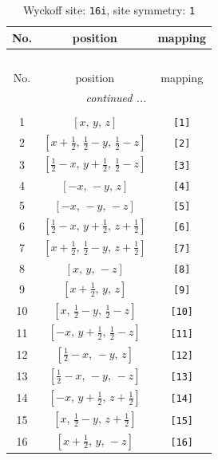 \documentclass[fleqn,8pt]{jsarticle}
\begin{document}
\begin{longtable}{ccc}
\caption{Wyckoff site: {\tt 16i}, site symmetry: {\tt 1}}
 \\
 \hline \hline
No. & position & mapping \\ \hline \endfirsthead

\multicolumn{2}{l}{\tablename\ \thetable{}} \\
 \hline \hline
No. & position & mapping \\ \hline \endhead

 \hline \hline
\multicolumn{2}{r}{\footnotesize\it continued ...} \\ \endfoot

 \hline \hline
\multicolumn{2}{r}{} \\ \endlastfoot

1 & $\left[ x,\, y,\, z \right]$ & {\tt [1]} \\ \hline
2 & $\left[ x + \frac{1}{2},\, \frac{1}{2} - y,\, \frac{1}{2} - z \right]$ & {\tt [2]} \\ \hline
3 & $\left[ \frac{1}{2} - x,\, y + \frac{1}{2},\, \frac{1}{2} - z \right]$ & {\tt [3]} \\ \hline
4 & $\left[ - x,\, - y,\, z \right]$ & {\tt [4]} \\ \hline
5 & $\left[ - x,\, - y,\, - z \right]$ & {\tt [5]} \\ \hline
6 & $\left[ \frac{1}{2} - x,\, y + \frac{1}{2},\, z + \frac{1}{2} \right]$ & {\tt [6]} \\ \hline
7 & $\left[ x + \frac{1}{2},\, \frac{1}{2} - y,\, z + \frac{1}{2} \right]$ & {\tt [7]} \\ \hline
8 & $\left[ x,\, y,\, - z \right]$ & {\tt [8]} \\ \hline
9 & $\left[ x + \frac{1}{2},\, y,\, z \right]$ & {\tt [9]} \\ \hline
10 & $\left[ x,\, \frac{1}{2} - y,\, \frac{1}{2} - z \right]$ & {\tt [10]} \\ \hline
11 & $\left[ - x,\, y + \frac{1}{2},\, \frac{1}{2} - z \right]$ & {\tt [11]} \\ \hline
12 & $\left[ \frac{1}{2} - x,\, - y,\, z \right]$ & {\tt [12]} \\ \hline
13 & $\left[ \frac{1}{2} - x,\, - y,\, - z \right]$ & {\tt [13]} \\ \hline
14 & $\left[ - x,\, y + \frac{1}{2},\, z + \frac{1}{2} \right]$ & {\tt [14]} \\ \hline
15 & $\left[ x,\, \frac{1}{2} - y,\, z + \frac{1}{2} \right]$ & {\tt [15]} \\ \hline
16 & $\left[ x + \frac{1}{2},\, y,\, - z \right]$ & {\tt [16]} \\
\end{longtable}
\end{document}
